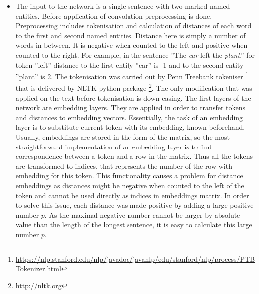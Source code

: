 \begin{itemize}
  \item
The input to the network is a single sentence with two marked named entities. Before application of convolution preprocessing 
is done. Preprocessing includes tokenisation and calculation of distances of each word to the first and second
named entities. Distance here is simply a number of words in between. It is negative when counted to the left and positive when counted to the right. For example, in the sentence ''The 
\textit{car} left the \textit{plant}.'' for token ''left'' distance to the first entity ''car'' is -1 and to the 
second entity ''plant'' is 2. The 
tokenisation was carried out by Penn Treebank tokeniser \footnote{\url{https://nlp.stanford.edu/nlp/javadoc/javanlp/edu/stanford/nlp/process/PTBTokenizer.html}} that is delivered by NLTK  python package \footnote{http://nltk.org}. The only modification that was applied on the text before tokenisation is down casing. The first layers of the network are embedding layers. They are applied in order to transfer tokens and distances to 
embedding vectors. Essentially, the task of an embedding layer is to substitute current token with 
its embedding, known beforehand. Usually, embeddings are stored in the form of the matrix, so 
the most straightforward implementation of an embedding layer is to find correspondence between a token and a row in the matrix. Thus all the tokens are transformed to indices, that 
represents the number of the row with embedding for this token. This functionality causes a problem for 
distance embeddings as distances might be negative when counted to the left of the token and 
cannot be used directly as indices in embeddings matrix.
In order to solve this issue, each distance was made 
positive by adding a large positive number $p$. As the maximal negative number cannot be 
larger by absolute value than the length of the longest sentence, it is easy to calculate this large 
number $p$. 


\end{itemize}
